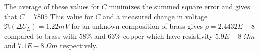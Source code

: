 The average of these values for $C$ minimizes the summed square error and gives that $C=7805$
This value for $C$ and a measured change in voltage $\Re(\Delta U_L) = 1.22 mV$ for an unknown composition of brass gives $\rho = 2.4432E-8$ compared to brass with 58\% and 63\% copper which have resistivity $5.9E-8 \; \Omega m$ and 
$7.1E-8 \; \Omega m$ respectively.
